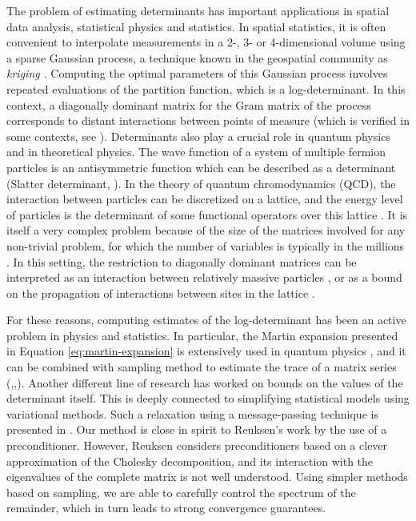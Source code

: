 The problem of estimating determinants has important applications
in spatial data analysis, statistical physics and statistics. In spatial
statistics, it is often convenient to interpolate measurements in
a 2-, 3- or 4-dimensional volume using a sparse Gaussian process,
a technique known in the geospatial community as \emph{kriging }\cite{zhang2010kriging,li2005analysis}\emph{.
}Computing the optimal parameters of this Gaussian process involves
repeated evaluations of the partition function, which is a log-determinant.
In this context, a diagonally dominant matrix for the Gram matrix
of the process corresponds to distant interactions between points
of measure (which is verified in some contexts, see \cite{KelleyPace1997291}).
Determinants also play a crucial role in quantum physics and in theoretical
physics. The wave function of a system of multiple fermion particles
is an antisymmetric function which can be described as a determinant
(Slatter determinant, \cite{atkins2011molecular,lowdin1955quantum}).
In the theory of quantum chromodynamics (QCD), the interaction between
particles can be discretized on a lattice, and the energy level of
particles is the determinant of some functional operators over this
lattice \cite{duncan1998efficient}. It is itself a very complex problem
because of the size of the matrices involved for any non-trivial problem,
for which the number of variables is typically in the millions \cite{bernardson1994monte}.
In this setting, the restriction to diagonally dominant matrices can
be interpreted as an interaction between relatively massive particles
\cite{deForcrand1989516}, or as a bound on the propagation of interactions
between sites in the lattice \cite{bernardson1994monte}.

For these reasons, computing estimates of the log-determinant has
been an active problem in physics and statistics. In particular, the
Martin expansion presented in Equation \ref{eq:martin-expansion}
is extensively used in quantum physics \cite{Ipsen2006}, and it can
be combined with sampling method to estimate the trace of a matrix
series (\cite{Zhang2008},\cite{McCourt2008},\cite{Zhang2007}).
Another different line of research has worked on bounds on the values
of the determinant itself. This is deeply connected to simplifying
statistical models using variational methods. Such a relaxation using
a message-passing technique is presented in \cite{Wainwright2006}.
Our method is close in spirit to Reuksen's work \cite{Reusken2002}
by the use of a preconditioner. However, Reuksen considers preconditioners
based on a clever approximation of the Cholesky decomposition, and
its interaction with the eigenvalues of the complete matrix is not
well understood. Using simpler methods based on sampling, we are able
to carefully control the spectrum of the remainder, which in turn
leads to strong convergence guarantees.


